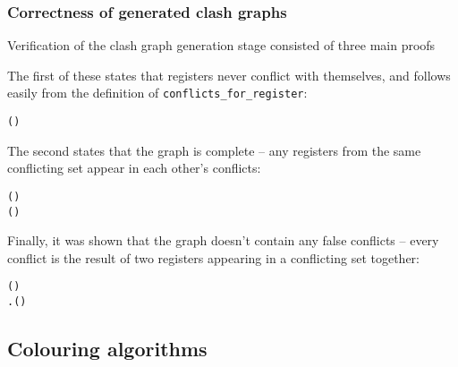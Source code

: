 \documentclass{beamer}
\begin{document}
\begin{frame}[containsverbatim]
\frametitle{Correctness of generated clash graphs}
Verification of the clash graph generation stage consisted of three main proofs

The first of these states that registers never conflict with themselves, and follows easily from the definition of \texttt{conflicts\_for\_register}:

\begin{alltt}\small
	\HOLTokenTurnstile{}  \HOLTokenNotIn{}  (   )
\end{alltt}

The second states that the graph is complete -- any registers from the same conflicting set appear in each other's conflicts:

\begin{alltt}\small
	\HOLTokenTurnstile{}   (  ) \HOLTokenConj{}    \HOLTokenConj{}    \HOLTokenConj{}
    \HOLTokenNotEqual{}  \HOLTokenImp{}
     (   )
\end{alltt}
\end{frame}

\begin{frame}[containsverbatim]
Finally, it was shown that the graph doesn't contain any false conflicts -- every conflict is the result of two registers appearing in a conflicting set together:

\begin{alltt}\small
	\HOLTokenTurnstile{}   (   ) \HOLTokenImp{}
   \HOLTokenExists{}.   (  ) \HOLTokenConj{}    \HOLTokenConj{}   
\end{alltt}
\end{frame}

\subsection{Colouring algorithms}
\end{document}
